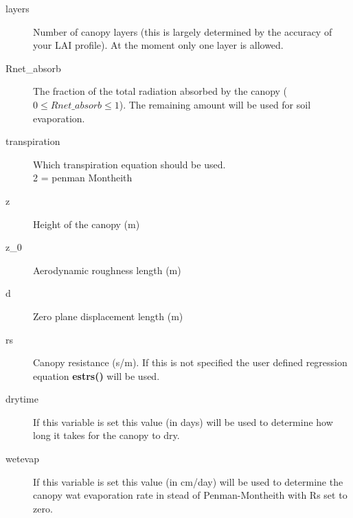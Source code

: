 \begin{description}
\item[layers]
Number of canopy layers (this is largely determined by the accuracy of your
LAI profile). At the moment only one layer is allowed.

\item[Rnet\_absorb]
The fraction of the total radiation absorbed by the canopy ($0\le
Rnet\_absorb \le 1$). The remaining amount will be used for soil
evaporation.

\item[transpiration]
Which transpiration equation should be used.
\\
2 = penman Montheith
\item[z]
Height of the canopy (m)

\item[z\_0]
Aerodynamic roughness length (m)

\item[d]
Zero plane displacement length (m)

\item[rs]
Canopy resistance (s/m). If this is not specified the user defined regression 
equation {\bf estrs()} will be used.

\item[drytime]
If this variable is set this value (in days) will be used to determine
how long it takes for the canopy to dry. 

\item[wetevap]
If this variable is set this value (in cm/day) will be used to determine
the canopy wat evaporation rate in stead of Penman-Montheith with
Rs set to zero.
\end{description}

